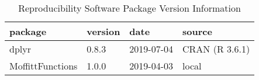 \documentclass[table]{article}
\begin{document}
\begin{table}[t]

\caption{\label{tab:23}Reproducibility Software Package Version Information}
\centering
\fontsize{8}{10}\selectfont
\begin{tabular}{llll}
\toprule
package & version & date & source\\
\midrule
dplyr & 0.8.3 & 2019-07-04 & CRAN (R 3.6.1)\\
MoffittFunctions & 1.0.0 & 2019-04-03 & local\\
\bottomrule
\end{tabular}
\end{table}
\end{document}
